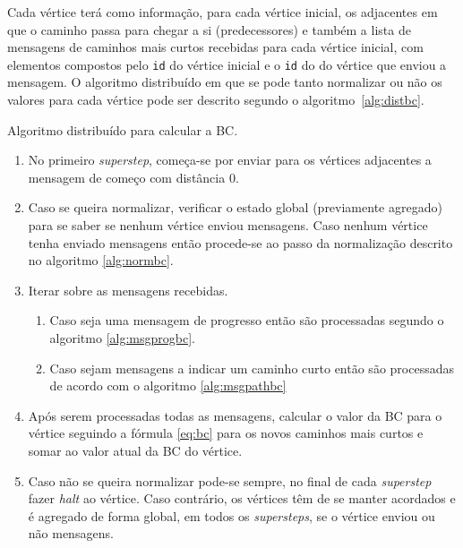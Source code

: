 Cada vértice terá como informação, para cada vértice inicial, os adjacentes em que o caminho passa para chegar a si (predecessores) e também a 
lista de mensagens de caminhos mais curtos recebidas para cada vértice inicial, com elementos compostos pelo \verb|id| do vértice inicial e o \verb|id| do do vértice que enviou a mensagem. O algoritmo distribuído em que se pode tanto normalizar ou não os 
valores para cada vértice pode ser descrito segundo o algoritmo~\ref{alg:distbc}.

\begin{algorithm}
  \caption{Algoritmo distribuído para calcular a BC.}
  \label{alg:distbc}
  \begin{enumerate}  
    \item No primeiro \textit{superstep}, começa-se por enviar 
  para os vértices adjacentes a mensagem de começo com distância 0.
    \item Caso se queira normalizar, verificar o estado global (previamente 
agregado) para se saber se nenhum vértice enviou mensagens. Caso nenhum vértice 
tenha enviado mensagens então procede-se ao passo da normalização descrito no 
algoritmo \ref{alg:normbc}.
    \item Iterar sobre as mensagens recebidas.
    \begin{enumerate}
      \item Caso seja uma mensagem de progresso então são processadas segundo o 
algoritmo \ref{alg:msgprogbc}.
      \item Caso sejam mensagens a indicar um caminho curto então são 
processadas de acordo com o algoritmo \ref{alg:msgpathbc}
    \end{enumerate}
      \item Após serem processadas todas as mensagens, calcular o valor da 
BC para o vértice seguindo a fórmula \ref{eq:bc} para os novos caminhos mais 
curtos e somar ao valor atual da BC do vértice.
      \item Caso não se queira normalizar pode-se sempre, no final de cada 
\textit{superstep} fazer \textit{halt} ao vértice. Caso contrário, os vértices 
têm de se manter acordados e é agregado de forma global, em todos os 
\textit{supersteps}, se o vértice enviou ou não mensagens.
  \end{enumerate}
\end{algorithm}


